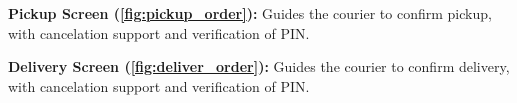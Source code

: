 \noindent\textbf{Pickup Screen (\ref{fig:pickup_order}):}  
Guides the courier to confirm pickup, with cancelation support and verification of PIN.

\noindent\textbf{Delivery Screen (\ref{fig:deliver_order}):}  
Guides the courier to confirm delivery, with cancelation support and verification of PIN.

\newpage


